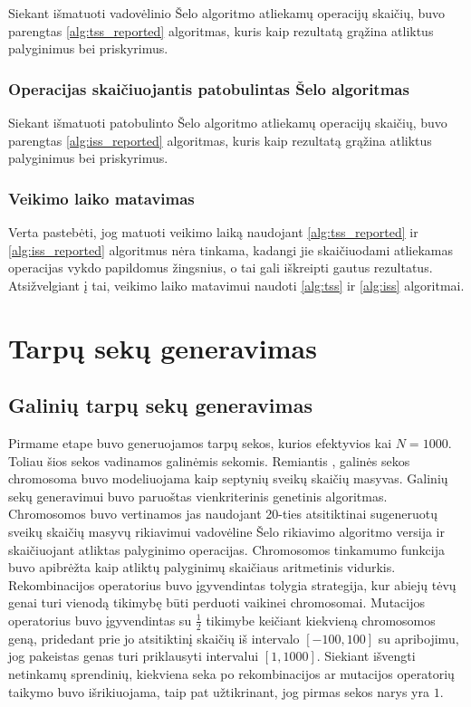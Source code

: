\documentclass{VUMIFInfKursinis}
\begin{document}
Siekant išmatuoti vadovėlinio Šelo algoritmo atliekamų operacijų skaičių,
buvo parengtas \ref{alg:tss_reported} algoritmas, kuris kaip rezultatą grąžina atliktus palyginimus bei priskyrimus.

\subsubsection{Operacijas skaičiuojantis patobulintas Šelo algoritmas}

Siekant išmatuoti patobulinto Šelo algoritmo atliekamų operacijų skaičių,
buvo parengtas \ref{alg:iss_reported} algoritmas, kuris kaip rezultatą grąžina atliktus palyginimus bei priskyrimus.

\subsubsection{Veikimo laiko matavimas}

Verta pastebėti, jog matuoti veikimo laiką naudojant \ref{alg:tss_reported} ir \ref{alg:iss_reported} algoritmus nėra tinkama,
kadangi jie skaičiuodami atliekamas operacijas vykdo papildomus žingsnius, o tai gali iškreipti gautus rezultatus.
Atsižvelgiant į tai, veikimo laiko matavimui naudoti \ref{alg:tss} ir \ref{alg:iss} algoritmai. 

\section{Tarpų sekų generavimas}

\subsection{Galinių tarpų sekų generavimas}
Pirmame etape buvo generuojamos tarpų sekos, kurios efektyvios kai $N=1000$.
Toliau šios sekos vadinamos galinėmis sekomis.
Remiantis \cite{simpson1999faster}, galinės sekos chromosoma buvo modeliuojama kaip
septynių sveikų skaičių masyvas.
Galinių sekų generavimui buvo paruoštas vienkriterinis genetinis algoritmas.
Chromosomos buvo vertinamos jas naudojant 20-ties atsitiktinai
sugeneruotų sveikų skaičių masyvų rikiavimui vadovėline Šelo rikiavimo algoritmo versija ir skaičiuojant atliktas palyginimo operacijas.
Chromosomos tinkamumo funkcija buvo apibrėžta kaip atliktų palyginimų skaičiaus aritmetinis vidurkis.
Rekombinacijos operatorius buvo įgyvendintas tolygia strategija, kur abiejų tėvų genai turi vienodą tikimybę
būti perduoti vaikinei chromosomai.
Mutacijos operatorius buvo įgyvendintas su $\frac{1}{2}$ tikimybe keičiant kiekvieną chromosomos geną,
pridedant prie jo atsitiktinį skaičių iš intervalo $[-100, 100]$ su apribojimu, jog pakeistas genas turi priklausyti intervalui $[1, 1000]$.
Siekiant išvengti netinkamų sprendinių, kiekviena seka po rekombinacijos ar mutacijos operatorių taikymo buvo išrikiuojama,
taip pat užtikrinant, jog pirmas sekos narys yra $1$.
\end{document}
